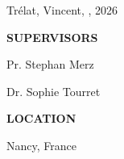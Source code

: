 \clearpage
\thispagestyle{empty}

\begingroup
  \setlength{\parindent}{0pt}%
  \small

  \vspace*{\fill}

  Tr\'{e}lat, Vincent, \textit{\ThesisTitle}, \textcopyright{} 2026

  \vspace{2.5em}

  \textbf{SUPERVISORS}\par
  Pr. Stephan Merz\par
  Dr. Sophie Tourret

  \vspace{2.5em}

  \textbf{LOCATION}\par
  Nancy, France
\endgroup

\clearpage
